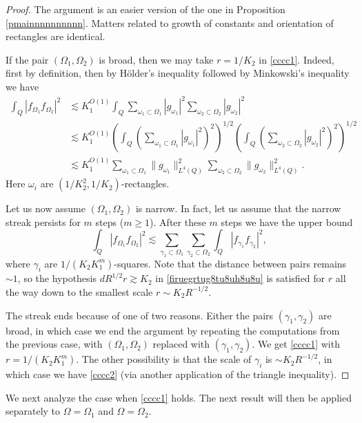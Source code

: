 \documentclass{amsart}%
\numberwithin{equation}{section}
\newcommand{\1}{\mathbbm{1}}
\begin{document}
\begin{proof}
The argument is an easier version of the one in 	Proposition \ref{pmainnnnnnnnnn}. Matters related to growth of constants and orientation of rectangles are identical. 


	
If the pair $(\Omega_1,\Omega_2)$ is broad, then we may take $r=1/K_2$ in \eqref{cccc1}. Indeed, first by definition, then by H\"older's inequality followed by Minkowski's inequality we have
\begin{align*}
\int_{Q}|f_{\Omega_1}f_{\Omega_2}|^2&
\lesssim K_1^{O(1)}\int_Q\sum_{\omega_1\subset\Omega_1}|g_{\omega_1}|^2\sum_{\omega_2\subset \Omega_2}|g_{\omega_2}|^2\\&\lesssim K_1^{O(1)}(\int_Q(\sum_{\omega_1\subset\Omega_1}|g_{\omega_1}|^2)^2)^{1/2}(\int_Q(\sum_{\omega_2\subset \Omega_2}|g_{\omega_2}|^2)^2)^{1/2}
\\&\lesssim K_1^{O(1)}\sum_{\omega_1\subset \Omega_1}\|g_{\omega_1}\|_{L^4(Q)}^2\sum_{\omega_2\subset \Omega_2}\|g_{\omega_2}\|_{L^4(Q)}^2.
\end{align*} 	
Here $\omega_i$ are $(1/K_2^2,1/K_2)$-rectangles.

Let us now assume $(\Omega_1,\Omega_2)$ is narrow. In fact, let us assume that the narrow streak persists for $m$ steps ($m\ge 1$).  After these $m$ steps we have the upper bound
$$
\int_{Q}|f_{\Omega_1}f_{\Omega_2}|^2
\lesssim \sum_{\gamma_1\subset \Omega_1}\sum_{\gamma_2\subset \Omega_2}\int_{{Q}}|f_{\gamma_1}f_{\gamma_2}|^2,$$
where $\gamma_i$ are $1/(K_2K_1^m)$-squares. Note that the distance between pairs remains $\sim 1$, so the  hypothesis $dR^{1/2}r \gtrsim K_2$ in \eqref{firuegrtug8tu8uh8u8u}   is satisfied for $r$ all the way down to the smallest scale $r\sim K_2R^{-1/2}$.


 The streak ends because of  one of two reasons. Either the pairs $(\gamma_1,\gamma_2)$ are broad, in which case we end the argument by repeating the computations from the previous case, with $(\Omega_1,\Omega_2)$ replaced with $(\gamma_1,\gamma_2)$. We get \eqref{cccc1} with $r=1/(K_2K_1^m)$. The other possibility is that the scale of $\gamma_i$ is $\sim K_2R^{-1/2}$, in which case we have \eqref{cccc2} (via another application of the triangle inequality). \qedhere

\end{proof}


We next analyze the case when \eqref{cccc1} holds. The next result will then be applied separately to $\Omega=\Omega_1$ and $\Omega=\Omega_2$.
\end{document}
